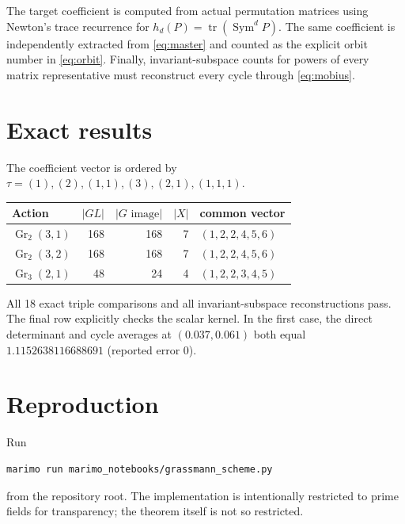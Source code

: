 \documentclass[11pt]{article}
\newcommand{\Sym}{\operatorname{Sym}}
\newcommand{\Gr}{\operatorname{Gr}}
\begin{document}
The target coefficient is computed from actual permutation matrices using
Newton's trace recurrence for $h_d(P)=\operatorname{tr}(\Sym^dP)$.  The same
coefficient is independently extracted from \eqref{eq:master} and counted as
the explicit orbit number in \eqref{eq:orbit}.  Finally, invariant-subspace
counts for powers of every matrix representative must reconstruct every cycle
through \eqref{eq:mobius}.

\section{Exact results}
The coefficient vector is ordered by
$\tau=(1),(2),(1,1),(3),(2,1),(1,1,1)$.
\begin{center}
\begin{tabular}{@{}lrrrl@{}}
\toprule
Action & $|GL|$ & $|G\text{ image}|$ & $|X|$ & common vector\\
\midrule
$\Gr_2(3,1)$ & 168 & 168 & 7 & $(1,2,2,4,5,6)$\\
$\Gr_2(3,2)$ & 168 & 168 & 7 & $(1,2,2,4,5,6)$\\
$\Gr_3(2,1)$ & 48 & 24 & 4 & $(1,2,2,3,4,5)$\\
\bottomrule
\end{tabular}
\end{center}
All 18 exact triple comparisons and all invariant-subspace reconstructions
pass.  The final row explicitly checks the scalar kernel.  In the first case,
the direct determinant and cycle averages at $(0.037,0.061)$ both equal
$1.1152638116688691$ (reported error $0$).

\section{Reproduction}
Run
\begin{verbatim}
marimo run marimo_notebooks/grassmann_scheme.py
\end{verbatim}
from the repository root.  The implementation is intentionally restricted to
prime fields for transparency; the theorem itself is not so restricted.
\end{document}
